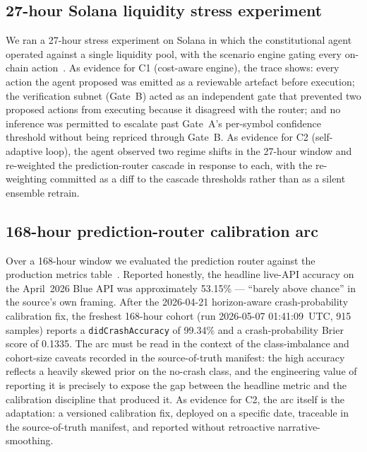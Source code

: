 \documentclass[11pt,a4paper]{article}
\begin{document}
\subsection{27-hour Solana liquidity stress experiment}\label{sec:case-studies:soak}

We ran a 27-hour stress experiment on Solana in which the constitutional
agent operated against a single liquidity pool, with the scenario engine
gating every on-chain
action~\cite{omnirisk2026soak,omnirisk2026deploy}. As evidence for C1
(cost-aware engine), the trace shows: every action the agent proposed
was emitted as a reviewable artefact before execution; the verification
subnet (Gate~B) acted as an independent gate that prevented two proposed
actions from executing because it disagreed with the router; and no
inference was permitted to escalate past Gate~A's per-symbol confidence
threshold without being repriced through Gate~B. As evidence for C2
(self-adaptive loop), the agent observed two regime shifts in the
27-hour window and re-weighted the prediction-router cascade in response
to each, with the re-weighting committed as a diff to the cascade
thresholds rather than as a silent ensemble retrain.

\subsection{168-hour prediction-router calibration arc}\label{sec:case-studies:router}

Over a 168-hour window we evaluated the prediction router against the
production metrics
table~\cite{omnirisk2026predmetrics,omnirisk2026calibration}. Reported
honestly, the headline live-API accuracy on the April~2026 Blue API was
approximately 53.15\% --- ``barely above chance'' in the source's own
framing. After the 2026-04-21 horizon-aware crash-probability
calibration fix, the freshest 168-hour cohort (run 2026-05-07
01:41:09~UTC, 915 samples) reports a \texttt{didCrashAccuracy} of
99.34\% and a crash-probability Brier score of 0.1335. The arc must be
read in the context of the class-imbalance and cohort-size caveats
recorded in the source-of-truth manifest: the high accuracy reflects a
heavily skewed prior on the no-crash class, and the engineering value of
reporting it is precisely to expose the gap between the headline metric
and the calibration discipline that produced it. As evidence for C2, the
arc itself is the adaptation: a versioned calibration fix, deployed on a
specific date, traceable in the source-of-truth manifest, and reported
without retroactive narrative-smoothing.
\end{document}
